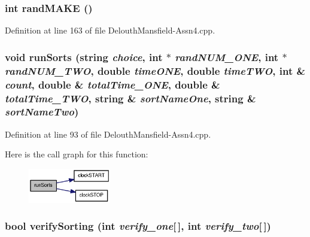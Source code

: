 \hypertarget{_delouth_mansfield-_assn4_8cpp_a191743d28b671610e8d78df14b41ed9e}{
\subsubsection[{randMAKE}]{\setlength{\rightskip}{0pt plus 5cm}int randMAKE ()}}
\label{_delouth_mansfield-_assn4_8cpp_a191743d28b671610e8d78df14b41ed9e}


Definition at line 163 of file DelouthMansfield-\/Assn4.cpp.

\hypertarget{_delouth_mansfield-_assn4_8cpp_ab8afa82cf87b47530bd2505812a9fc82}{
\subsubsection[{runSorts}]{\setlength{\rightskip}{0pt plus 5cm}void runSorts (string {\em choice}, \/  int $\ast$ {\em randNUM\_\-ONE}, \/  int $\ast$ {\em randNUM\_\-TWO}, \/  double {\em timeONE}, \/  double {\em timeTWO}, \/  int \& {\em count}, \/  double \& {\em totalTime\_\-ONE}, \/  double \& {\em totalTime\_\-TWO}, \/  string \& {\em sortNameOne}, \/  string \& {\em sortNameTwo})}}
\label{_delouth_mansfield-_assn4_8cpp_ab8afa82cf87b47530bd2505812a9fc82}


Definition at line 93 of file DelouthMansfield-\/Assn4.cpp.



Here is the call graph for this function:\nopagebreak
\begin{figure}[H]
\begin{center}
\leavevmode
\includegraphics[width=102pt]{_delouth_mansfield-_assn4_8cpp_ab8afa82cf87b47530bd2505812a9fc82_cgraph}
\end{center}
\end{figure}


\hypertarget{_delouth_mansfield-_assn4_8cpp_ae2cf0cca1e089e83ae98750b96b8cf11}{
\subsubsection[{verifySorting}]{\setlength{\rightskip}{0pt plus 5cm}bool verifySorting (int {\em verify\_\-one}\mbox{[}$\,$\mbox{]}, \/  int {\em verify\_\-two}\mbox{[}$\,$\mbox{]})}}
\label{_delouth_mansfield-_assn4_8cpp_ae2cf0cca1e089e83ae98750b96b8cf11}


